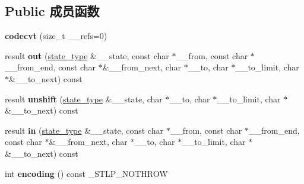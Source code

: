 \subsection*{Public 成员函数}
\begin{DoxyCompactItemize}
\item 
\mbox{\label{classcodecvt_3_01char_00_01char_00_01mbstate__t_01_4_ae836d4233b00c2176287e752f5884716}} 
{\bfseries codecvt} (size\+\_\+t \+\_\+\+\_\+refs=0)
\item 
\mbox{\label{classcodecvt_3_01char_00_01char_00_01mbstate__t_01_4_a46f61e1aadff1c5888d5f7d0464c7c4d}} 
result {\bfseries out} (\hyperlink{struct____mbstate__t}{state\+\_\+type} \&\+\_\+\+\_\+state, const char $\ast$\+\_\+\+\_\+from, const char $\ast$\+\_\+\+\_\+from\+\_\+end, const char $\ast$\&\+\_\+\+\_\+from\+\_\+next, char $\ast$\+\_\+\+\_\+to, char $\ast$\+\_\+\+\_\+to\+\_\+limit, char $\ast$\&\+\_\+\+\_\+to\+\_\+next) const
\item 
\mbox{\label{classcodecvt_3_01char_00_01char_00_01mbstate__t_01_4_a803c6580de1cf37800b3154b1c9ae0b0}} 
result {\bfseries unshift} (\hyperlink{struct____mbstate__t}{state\+\_\+type} \&\+\_\+\+\_\+state, char $\ast$\+\_\+\+\_\+to, char $\ast$\+\_\+\+\_\+to\+\_\+limit, char $\ast$\&\+\_\+\+\_\+to\+\_\+next) const
\item 
\mbox{\label{classcodecvt_3_01char_00_01char_00_01mbstate__t_01_4_a259a4eeebab2751382f29681829af89e}} 
result {\bfseries in} (\hyperlink{struct____mbstate__t}{state\+\_\+type} \&\+\_\+\+\_\+state, const char $\ast$\+\_\+\+\_\+from, const char $\ast$\+\_\+\+\_\+from\+\_\+end, const char $\ast$\&\+\_\+\+\_\+from\+\_\+next, char $\ast$\+\_\+\+\_\+to, char $\ast$\+\_\+\+\_\+to\+\_\+limit, char $\ast$\&\+\_\+\+\_\+to\+\_\+next) const
\item 
\mbox{\label{classcodecvt_3_01char_00_01char_00_01mbstate__t_01_4_a6f7037bdab246801d845a9a7a91d3fb8}} 
int {\bfseries encoding} () const \+\_\+\+S\+T\+L\+P\+\_\+\+N\+O\+T\+H\+R\+OW
\item 
\mbox{\label{classcodecvt_3_01char_00_01char_00_01mbstate__t_01_4_a9f17a391fbba0669c59c66a45929969f}} 

\end{DoxyCompactItemize}
